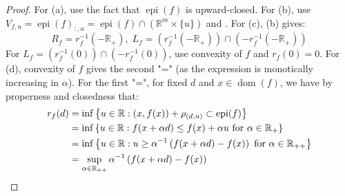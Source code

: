 \begin{proof}
	For (a), use the fact that $\operatorname{epi}(f)$ is upward-closed.	For (b), use $V_{f,u}=\operatorname{epi}(f)_{:,u}=\operatorname{epi}(f)\cap \left(\mathbb{R}^m\times \{u\}\right)$ and . For (c), (b) gives:
	\[
		R_f=r_f^{-1}\left(-\mathbb{R}_{+}\right),\;
		L_f=\left(r_f^{-1}\left(-\mathbb{R}_{+}\right)\right)\cap\left(-r_f^{-1}(-\mathbb{R}_{+})\right)
	\]
	For $L_f=\left(r_f^{-1}(0)\right)\cap\left(-r_f^{-1}(0)\right)$, use convexity of $f$ and $r_f(0)=0$. For (d), convexity of $f$ gives the second "=" (as the expression is monotically increasing in $\alpha $). For the first "=", for fixed $d$ and $x\in \operatorname{dom}(f)$, we have by properness and closedness that:
	\begin{align*}
		r_f(d) & =\inf \left\{u\in \mathbb{R}:(x,f(x))+\rho_{(d,u)}\subset \operatorname{epi}(f)\right\}                                       \\
		       & = \inf \left\{u\in \mathbb{R}:f(x+\alpha d)\leq f(x)+\alpha u\text{ for }\alpha \in \mathbb{R}_+\right\}                      \\
		       & = \inf \left\{u\in \mathbb{R}:u\geq \alpha^{-1}\left(f(x+\alpha d)- f(x)\right)\text{ for }\alpha \in \mathbb{R}_{++}\right\} \\
		       & = \sup_{\alpha \in \mathbb{R}_{++}} \alpha^{-1}\left(f(x+\alpha d)- f(x)\right)\qedhere{}
	\end{align*}
\end{proof}



